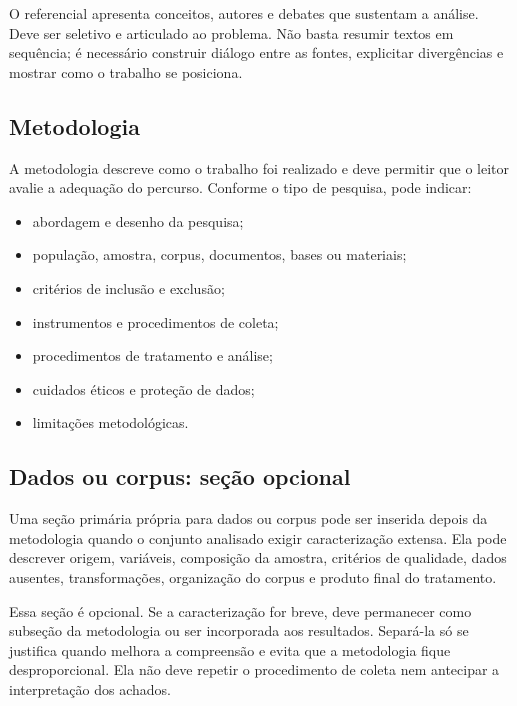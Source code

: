 O referencial apresenta conceitos, autores e debates que sustentam a análise. Deve ser seletivo e articulado ao problema. Não basta resumir textos em sequência; é necessário construir diálogo entre as fontes, explicitar divergências e mostrar como o trabalho se posiciona.

\subsection{Metodologia}

A metodologia descreve como o trabalho foi realizado e deve permitir que o leitor avalie a adequação do percurso. Conforme o tipo de pesquisa, pode indicar:

\begin{itemize}
  \item abordagem e desenho da pesquisa;
  \item população, amostra, corpus, documentos, bases ou materiais;
  \item critérios de inclusão e exclusão;
  \item instrumentos e procedimentos de coleta;
  \item procedimentos de tratamento e análise;
  \item cuidados éticos e proteção de dados;
  \item limitações metodológicas.
\end{itemize}


\subsection{Dados ou corpus: seção opcional}

Uma seção primária própria para dados ou corpus pode ser inserida depois da metodologia quando o conjunto analisado exigir caracterização extensa. Ela pode descrever origem, variáveis, composição da amostra, critérios de qualidade, dados ausentes, transformações, organização do corpus e produto final do tratamento.

Essa seção é opcional. Se a caracterização for breve, deve permanecer como subseção da metodologia ou ser incorporada aos resultados. Separá-la só se justifica quando melhora a compreensão e evita que a metodologia fique desproporcional. Ela não deve repetir o procedimento de coleta nem antecipar a interpretação dos achados.

